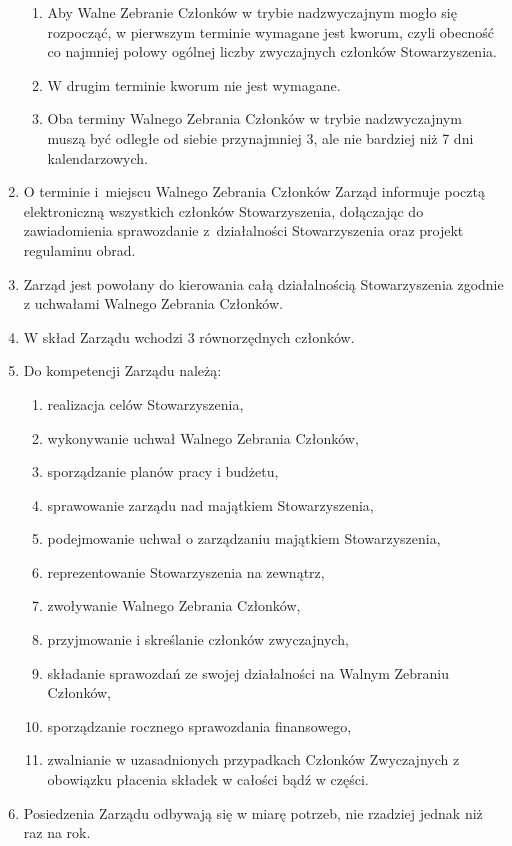 \documentclass{article}
\begin{document}
\begin{enumerate}
\begin{enumerate}
        \item Aby Walne Zebranie Członków w trybie nadzwyczajnym mogło się rozpocząć, w pierwszym terminie wymagane jest kworum, czyli obecność co najmniej połowy ogólnej liczby zwyczajnych członków Stowarzyszenia.
        \item W drugim terminie kworum nie jest wymagane.
        \item Oba terminy Walnego Zebrania Członków w trybie nadzwyczajnym muszą być odległe od siebie przynajmniej 3, ale nie bardziej niż 7 dni kalendarzowych.
      \end{enumerate}
    \item O terminie i~miejscu Walnego Zebrania Członków Zarząd informuje pocztą elektroniczną wszystkich członków Stowarzyszenia, dołączając do zawiadomienia sprawozdanie z~działalności Stowarzyszenia oraz projekt regulaminu obrad.
    \item Zarząd jest powołany do kierowania całą działalnością Stowarzyszenia zgodnie z uchwałami Walnego Zebrania Członków.
    \item W skład Zarządu wchodzi 3 równorzędnych członków.
    \item Do kompetencji Zarządu należą:
      \begin{enumerate}
        \item realizacja celów Stowarzyszenia,
        \item wykonywanie uchwał Walnego Zebrania Członków,
        \item sporządzanie planów pracy i budżetu,
        \item sprawowanie zarządu nad majątkiem Stowarzyszenia,
        \item podejmowanie uchwał o zarządzaniu majątkiem Stowarzyszenia,
        \item reprezentowanie Stowarzyszenia na zewnątrz,
        \item zwoływanie Walnego Zebrania Członków,
        \item przyjmowanie i skreślanie członków zwyczajnych,
        \item składanie sprawozdań ze swojej działalności na Walnym Zebraniu Członków,
        \item sporządzanie rocznego sprawozdania finansowego,
        \item zwalnianie w uzasadnionych przypadkach Członków Zwyczajnych z obowiązku płacenia składek w całości bądź w części.
      \end{enumerate}
    \item Posiedzenia Zarządu odbywają się w miarę potrzeb, nie rzadziej jednak niż raz na rok.

\end{enumerate}
\end{document}

